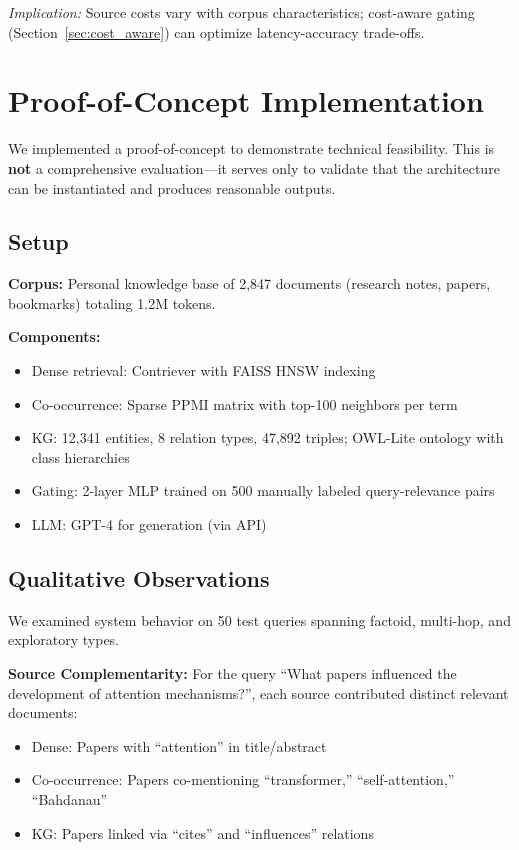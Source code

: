 \documentclass[11pt,a4paper]{article}
\begin{document}
\textit{Implication:} Source costs vary with corpus characteristics; cost-aware gating (Section~\ref{sec:cost_aware}) can optimize latency-accuracy trade-offs.

\section{Proof-of-Concept Implementation}
\label{sec:poc}

We implemented a proof-of-concept to demonstrate technical feasibility. This is \textbf{not} a comprehensive evaluation---it serves only to validate that the architecture can be instantiated and produces reasonable outputs.

\subsection{Setup}

\textbf{Corpus:} Personal knowledge base of 2,847 documents (research notes, papers, bookmarks) totaling 1.2M tokens.

\textbf{Components:}
\begin{itemize}
    \item Dense retrieval: Contriever with FAISS HNSW indexing
    \item Co-occurrence: Sparse PPMI matrix with top-100 neighbors per term
    \item KG: 12,341 entities, 8 relation types, 47,892 triples; OWL-Lite ontology with class hierarchies
    \item Gating: 2-layer MLP trained on 500 manually labeled query-relevance pairs
    \item LLM: GPT-4 for generation (via API)
\end{itemize}

\subsection{Qualitative Observations}

We examined system behavior on 50 test queries spanning factoid, multi-hop, and exploratory types.

\textbf{Source Complementarity:} For the query ``What papers influenced the development of attention mechanisms?'', each source contributed distinct relevant documents:
\begin{itemize}
    \item Dense: Papers with ``attention'' in title/abstract
    \item Co-occurrence: Papers co-mentioning ``transformer,'' ``self-attention,'' ``Bahdanau''
    \item KG: Papers linked via ``cites'' and ``influences'' relations
\end{itemize}
\end{document}
